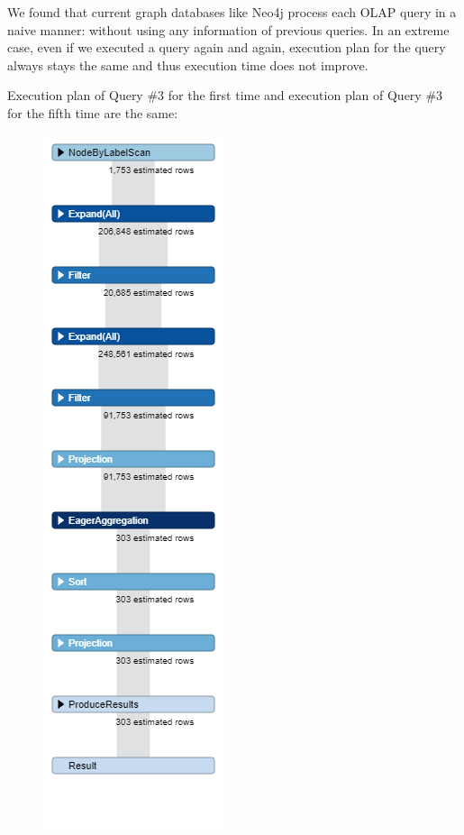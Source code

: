 We found that current graph databases like Neo4j process each OLAP query in a naive manner: without using any information of previous queries. In an extreme case, even if we executed a query again and again, execution plan for the query always stays the same and thus execution time does not improve. 

Execution plan of Query \#3 for the first time and execution plan of Query \#3 for the fifth time are the same:
\begin {figure}[H]
\centering
\includegraphics[scale=0.4]{pic/5.png}

\end{figure}
